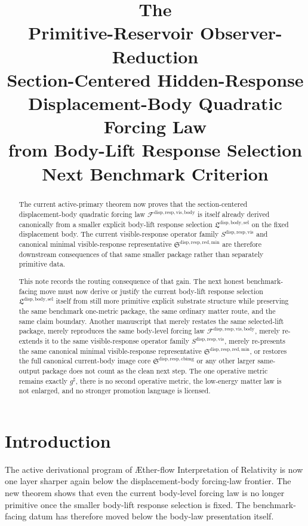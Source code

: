 \documentclass[11pt]{article}
\title{\textbf{The \TheoryName{}}\\[0.4em]
\large Primitive-Reservoir Observer-Reduction\\
\large Section-Centered Hidden-Response\\
\large Displacement-Body Quadratic Forcing Law\\
\large from Body-Lift Response Selection\\
\large Next Benchmark Criterion}
\author{}
\date{}
\newcommand{\Aflow}{\AE{}ther-flow}
\newcommand{\TheoryName}{\Aflow{} Interpretation of Relativity}
\newcommand{\CompletedMetric}{g^{\sharp}}
\newcommand{\LiftSelectionPackage}{\mathfrak L^{\mathrm{disp,body,sel}}}
\newcommand{\VisibleBodyForcingLaw}{\mathscr F^{\mathrm{disp,resp,vis,body}}}
\newcommand{\VisibleResponseOperator}{S^{\mathrm{disp,resp,vis}}}
\newcommand{\MinimalReducedStructure}{\mathfrak S^{\mathrm{disp,resp,red,min}}}
\newcommand{\CurrentBodyImageCore}{\mathfrak S^{\mathrm{disp,resp,cbimg}}}
\begin{document}
\maketitle

\begin{abstract}
The current active-primary theorem now proves that the section-centered displacement-body quadratic forcing law \(\VisibleBodyForcingLaw\) is itself already derived canonically from a smaller explicit body-lift response selection \(\LiftSelectionPackage\) on the fixed displacement body. The current visible-response operator family \(\VisibleResponseOperator\) and canonical minimal visible-response representative \(\MinimalReducedStructure\) are therefore downstream consequences of that same smaller package rather than separately primitive data.

This note records the routing consequence of that gain. The next honest benchmark-facing move must now derive or justify the current body-lift response selection \(\LiftSelectionPackage\) itself from still more primitive explicit substrate structure while preserving the same benchmark one-metric package, the same ordinary matter route, and the same claim boundary. Another manuscript that merely restates the same selected-lift package, merely reproduces the same body-level forcing law \(\VisibleBodyForcingLaw\), merely re-extends it to the same visible-response operator family \(\VisibleResponseOperator\), merely re-presents the same canonical minimal visible-response representative \(\MinimalReducedStructure\), or restores the full canonical current-body image core \(\CurrentBodyImageCore\) or any other larger same-output package does not count as the clean next step. The one operative metric remains exactly \(\CompletedMetric\), there is no second operative metric, the low-energy matter law is not enlarged, and no stronger promotion language is licensed.
\end{abstract}

\section{Introduction}

The active derivational program of \TheoryName{} is now one layer sharper again below the displacement-body forcing-law frontier. The new theorem shows that even the current body-level forcing law is no longer primitive once the smaller body-lift response selection is fixed. The benchmark-facing datum has therefore moved below the body-law presentation itself.
\end{document}
